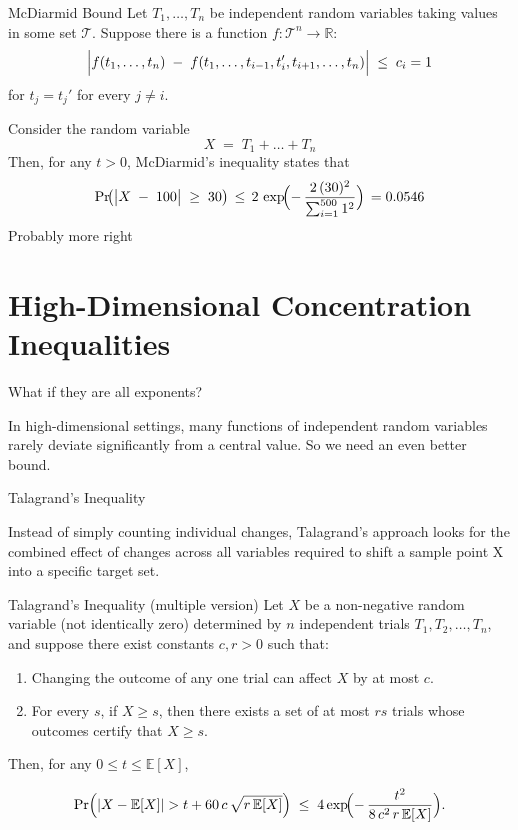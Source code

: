 \documentclass[aspectratio=169, handout]{beamer}
\begin{document}
\begin{frame}{McDiarmid Bound}
    Let $T_1,\dots,T_n$ be independent random variables taking values in some set $\mathcal{T}$. 
    Suppose there is a function $f:\mathcal{T}^n \to \mathbb{R}$:
    \[
    \Bigl| f(t_1,\dots,t_n) 
          \;-\; f(t_1,\dots,t_{i-1},t_i',t_{i+1},\dots,t_n) 
    \Bigr| \;\le\; c_i = 1
    \]
    for $t_j = t_j'$ for every $j \neq i.$ 
    
    \medskip
    
    \noindent
    Consider the random variable
    \[
    X \;=\; T_1 +  \dots + T_n
    \]
    Then, for any $t > 0$, McDiarmid's inequality states that
    \[
    \Pr\!\bigl( \bigl| X \;-\; 100\bigr| \;\ge\; 30\bigr)
    \,\le\, 
    2 \,\exp\!\Bigl(-\,\frac{2\,(30)^2}{\sum_{i=1}^{500} 1^2}\Bigr)\, =  0.0546
    \]
    Probably more right
\end{frame}

\section{High-Dimensional Concentration Inequalities}
\frame{\sectionpage}
\begin{frame}{What if they are all exponents? }

    In high-dimensional settings, many functions of independent random variables rarely deviate significantly from a central value. So we need an even better bound.
   
\end{frame}

\begin{frame}{Talagrand's Inequality}

    Instead of simply counting individual changes, Talagrand's approach looks for the combined effect of changes across all variables required to shift a sample point X into a specific target set.
   
\end{frame}
\begin{frame}{Talagrand's Inequality }
(multiple version)
    Let \( X \) be a non-negative random variable (not identically zero) determined by \( n \) independent trials \( T_1, T_2, \dots, T_n \), and suppose there exist constants \( c, r > 0 \) such that:
    \begin{enumerate}
        \item Changing the outcome of any one trial can affect \( X \) by at most \( c \).
        \item For every \( s \), if \( X \ge s \), then there exists a set of at most \( r s \) trials whose outcomes certify that \( X \ge s \).
    \end{enumerate}
Then, for any \( 0 \le t \le \mathbb{E}[X] \),

    \[
    \Pr\Bigl(\lvert X - \mathbb{E}[X]\rvert > t + 60\,c\,\sqrt{r\,\mathbb{E}[X]}\Bigr)
      \;\le\;
    4 \exp\!\Bigl(-\,\frac{t^2}{8\,c^2\,r\,\mathbb{E}[X]}\Bigr).
    \]
\end{frame}
\end{document}
